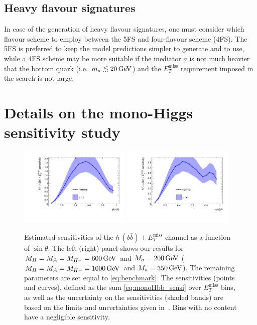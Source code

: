 \documentclass[a4paper, 11pt,notoc]{article}
\newcommand{\MET}{\ensuremath{E_T^\mathrm{miss}}\xspace}
\newcommand{\met}{\MET}
\newcommand{\mA}{\ensuremath{M_{A}}\xspace}
\newcommand{\ma}{\ensuremath{M_{a}}\xspace}
\newcommand{\mH}{\ensuremath{M_{H}}\xspace}
\newcommand{\mHc}{\ensuremath{M_{H^{\pm}}}\xspace}
\begin{document}
\subsection*{Heavy flavour signatures}

In case of the generation of heavy flavour signatures, one must consider which flavour scheme to employ between the 5FS and four-flavour scheme (4FS). The 5FS is preferred to keep the model predictions simpler to generate and to use, while a 4FS scheme may be more suitable if the mediator $a$ is not much heavier that the bottom quark (i.e.~$m_a \lesssim 20 \, {\rm GeV}$) and the $\MET$ requirement imposed in the search is not large. 


\section{Details on the mono-Higgs sensitivity study}
\label{app:extramonoh}

\begin{figure}[t!]
\centering
\includegraphics[width=0.475\textwidth]{monoHbb_sinp_scan_1_sensi_1D.pdf} \quad 
\includegraphics[width=0.475\textwidth]{monoHbb_sinp_scan_2_sensi_1D.pdf}
\vspace{4mm}
\caption{Estimated sensitivities of  the $h \, (b \bar b)+\MET$ channel as a function of $\sin \theta$. The left (right) panel shows our results for $\mH = \mA = \mHc = 600 \, {\rm GeV}$ and $\ma = 200 \, {\rm GeV}$ ($\mH = \mA = \mHc = 1000 \, {\rm GeV}$ and $\ma = 350 \, {\rm GeV}$).  The remaining parameters are set equal to \eqref{eq:benchmark}. The sensitivities (points and curves), defined as the sum \eqref{eq:monoHbb_sensi} over \met bins, as well as the uncertainty on the sensitivities (shaded bands)  are based on the limits and uncertainties given in~\cite{Aaboud:2017yqz}. Bins with no content have a negligible sensitivity. }
\label{fig:monoHbb_appendix1}
\end{figure}
\end{document}
